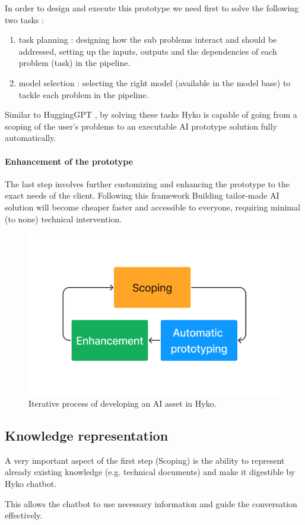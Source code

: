 \documentclass[a4paper,12pt]{article}
\begin{document}
In order to design and execute this prototype we need first to solve the following two tasks : 

\begin{enumerate}
	\item task planning : designing how the sub problems interact and should be addressed, setting up the inputs, outputs and the dependencies of each problem (task) in the pipeline.
	\item model selection : selecting the right model (available in the model base) to tackle each problem in the pipeline.
\end{enumerate}

Similar to HuggingGPT \cite{hugginggpt}, by solving these tasks Hyko is capable of going from a scoping of the user's problems to 
an executable AI prototype solution fully automatically.


\paragraph{Enhancement of the prototype}
The last step involves further customizing and enhancing the prototype to the exact needs of the client.
Following this framework Building tailor-made AI solution will become cheaper faster and accessible to everyone, requiring minimal (to none) technical intervention.


\begin{figure}[h]
	\centering
	\includegraphics[width=.5\linewidth]{figures/3process.png}
	\caption{Iterative process of developing an AI asset in Hyko.}
	\label{fig:hykoprocess}
\end{figure}

\subsection{Knowledge representation}
A very important aspect of the first step (Scoping) is the ability to represent already existing knowledge (e.g. technical documents) 
and make it digestible by Hyko chatbot. 

This allows the chatbot to use necessary information and guide the conversation effectively.
\end{document}
